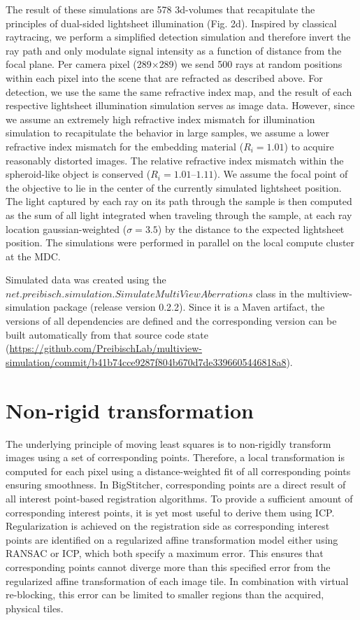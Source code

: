 The result of these simulations are 578 3d-volumes that recapitulate the principles of dual-sided lightsheet illumination (Fig. 2d). Inspired by classical raytracing, we perform a simplified detection simulation and therefore invert the ray path and only modulate signal intensity as a function of distance from the focal plane. Per camera pixel (289$\times$289) we send 500 rays at random positions within each pixel into the scene that are refracted as described above. For detection, we use the same the same refractive index map, and the result of each respective lightsheet illumination simulation serves as image data. However, since we assume an extremely high refractive index mismatch for illumination simulation to recapitulate the behavior in large samples, we assume a lower refractive index mismatch for the embedding material ($R_i=1.01$) to acquire reasonably distorted images. The relative refractive index mismatch within the spheroid-like object is conserved ($R_i=1.01 – 1.11$). We assume the focal point of the objective to lie in the center of the currently simulated lightsheet position. The light captured by each ray on its path through the sample is then computed as the sum of all light integrated when traveling through the sample, at each ray location  gaussian-weighted ($\sigma=3.5$) by the distance to the expected lightsheet position. The simulations were performed in parallel on the local compute cluster at the MDC.

Simulated data was created using the $net.preibisch.simulation.SimulateMultiViewAberrations$ class in the multiview-simulation package (release version 0.2.2). Since it is a Maven artifact, the versions of all dependencies are defined and the corresponding version can be built automatically from that source code state \small(\url{https://github.com/PreibischLab/multiview-simulation/commit/b41b74cce9287f804b670d7de3396605446818a8}).


\section{Non-rigid transformation}
\label{sec:nonrigid}

The underlying principle of moving least squares\cite{movingleastsquares} is to non-rigidly transform images using a set of corresponding points. Therefore, a local transformation is computed for each pixel using a distance-weighted fit of all corresponding points ensuring smoothness. In BigStitcher, corresponding points are a direct result of all interest point-based registration algorithms. To provide a sufficient amount of corresponding interest points, it is yet most useful to derive them using ICP\cite{icp}. Regularization is achieved on the registration side as corresponding interest points are identified on a regularized affine transformation model either using RANSAC\cite{ransac} or ICP\cite{icp}, which both specify a maximum error. This ensures that corresponding points cannot diverge more than this specified error from the regularized affine transformation of each image tile. In combination with virtual re-blocking, this error can be limited to smaller regions than the acquired, physical tiles. 

